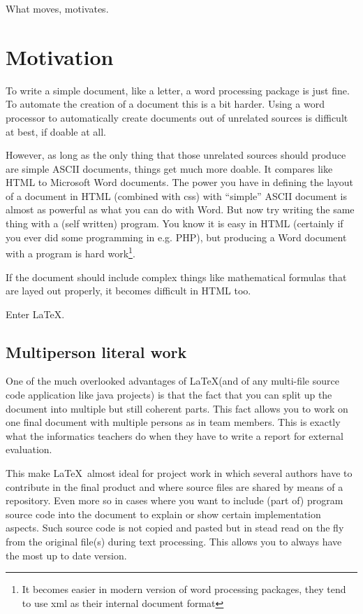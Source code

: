 \renewcommand\TheFile{ch02_motivates.tex}

\begin{savequote}[15cm]
  \vspace{-30mm}
  \raggedleft
  \sffamily
  What moves, motivates.
\end{savequote}
\chapter{Motivation}
To write a simple document, like a letter, a word processing package 
is just fine.
To automate the creation of a document this is a bit harder. 
Using a word processor to automatically create documents out of 
unrelated sources is difficult at best, if doable at all.

However, as long as the only thing that those unrelated sources should
produce are simple ASCII documents, things get much more
doable. It compares like HTML to Microsoft Word documents. The power
you have in defining the layout of a document in HTML (combined with
css) with ``simple'' ASCII document is almost as powerful as what you
can do with Word. But now try writing the same thing with a (self
written) program. You know it is easy in HTML (certainly if you ever
did some programming in e.g. PHP), but producing a Word document with
a program is hard work\footnote{It becomes easier in modern version of
word processing packages, they tend to use xml as their internal document format}. 

If the document should include complex things like mathematical
formulas that are layed out properly, it becomes difficult in HTML too.

Enter \LaTeX.

\section{Multiperson literal work}
One of the much overlooked advantages of \LaTeX (and of any multi-file
source code application like java projects) is that the fact that you
can split up the document into multiple but still coherent parts.
This fact allows you to work on one final document with multiple
persons as in team members. This is exactly what the informatics teachers do when they have
to write a report for external evaluation.

This make \LaTeX\ almost ideal for project work in which several
authors have to contribute in the final product and where source files
are shared by means of a repository. Even more so in
cases where you want to include (part of) program source code
into the document to explain or show certain implementation
aspects. Such source code is not copied and pasted but in stead read
on the fly from the original file(s) during text processing. This
allows you to always have the most up to date version.

